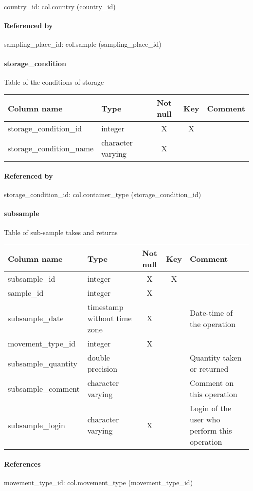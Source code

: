 country\_id: col.country (country\_id)

\paragraph{Referenced by}
sampling\_place\_id: col.sample (sampling\_place\_id)

\paragraph{storage\_condition}
Table of the conditions of storage

\begin{tabular}{|l| p{2cm}|c|c| p{5cm}|}
\hline
Column name & Type & Not null & Key & Comment \\
\hline
storage\_condition\_id & integer & X & X & \\
storage\_condition\_name & character varying & X &  & \\
\hline
\end{tabular}
\paragraph{Referenced by}
storage\_condition\_id: col.container\_type (storage\_condition\_id)

\paragraph{subsample}
Table of sub-sample takes and returns

\begin{tabular}{|l| p{2cm}|c|c| p{5cm}|}
\hline
Column name & Type & Not null & Key & Comment \\
\hline
subsample\_id & integer & X & X & \\
sample\_id & integer & X &  & \\
subsample\_date & timestamp without time zone & X &  & Date-time of the operation\\
movement\_type\_id & integer & X &  & \\
subsample\_quantity & double precision &  &  & Quantity taken or returned\\
subsample\_comment & character varying &  &  & Comment on this operation\\
subsample\_login & character varying & X &  & Login of the user who perform this operation\\
\hline
\end{tabular}
\paragraph{References}
movement\_type\_id: col.movement\_type (movement\_type\_id)

